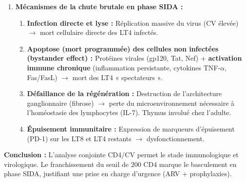 \documentclass[11pt]{article}
\begin{document}
\begin{exoresolu}
\begin{enumerate}
    \textbf{Prophylaxie primaire indiquée :} \textbf{Cotrimoxazole (Bactrim®) 960 mg/jour} (prévention pneumocystose, toxoplasmose, infections bactériennes, diarrhées). \textbf{+ Dépistage systématique de la Tuberculose (recherche BK, GeneXpert, Rx poumon)}. \textbf{Initiation ARV en urgence (dans les 2 semaines, voire jours si méningite cryptococcique)}.
    \item \textbf{Mécanismes de la chute brutale en phase SIDA :}
    \begin{enumerate}
        \item \textbf{Infection directe et lyse :} Réplication massive du virus (CV élevée) $\rightarrow$ mort cellulaire directe des LT4 infectés.
        \item \textbf{Apoptose (mort programmée) des cellules non infectées (bystander effect) :} Protéines virales (gp120, Tat, Nef) + \textbf{activation immune chronique} (inflammation persistante, cytokines TNF-$\alpha$, Fas/FasL) $\rightarrow$ mort des LT4 « spectateurs ».
        \item \textbf{Défaillance de la régénération :} Destruction de l'architecture ganglionnaire (fibrose) $\rightarrow$ perte du microenvironnement nécessaire à l'homéostasie des lymphocytes (IL-7). Thymus involué chez l'adulte.
        \item \textbf{Épuisement immunitaire :} Expression de marqueurs d'épuisement (PD-1) sur les LT8 et LT4 restants $\rightarrow$ dysfonctionnement.
    \end{enumerate}
\end{enumerate}
\textbf{Conclusion :} L'analyse conjointe CD4/CV permet le stade immunologique et virologique. Le franchissement du seuil de 200 CD4 marque le basculement en phase SIDA, justifiant une prise en charge d'urgence (ARV + prophylaxies).
\end{exoresolu}
\end{document}
